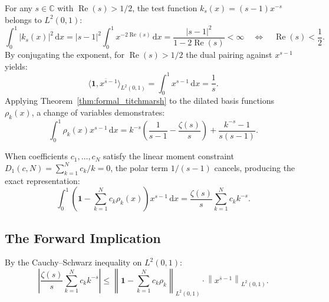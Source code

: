 \documentclass[11pt,a4paper]{article}
\theoremstyle{definition}
\newcommand{\dee}{\mathrm{d}}
\newcommand{\Cfield}{\mathbb{C}}
\begin{document}
For any $s \in \Cfield$ with $\operatorname{Re}(s) > 1/2$, the test function $k_s(x) = (s - 1) x^{-s}$ belongs to $L^2(0, 1)$:
\begin{equation}
\int_0^1 |k_s(x)|^2 \,\dee x = |s - 1|^2 \int_0^1 x^{-2\operatorname{Re}(s)}\,\dee x = \frac{|s - 1|^2}{1 - 2\operatorname{Re}(s)} < \infty \quad \Longleftrightarrow \quad \operatorname{Re}(s) < \frac{1}{2}.
\end{equation}
By conjugating the exponent, for $\operatorname{Re}(s) > 1/2$ the dual pairing against $x^{s-1}$ yields:
\begin{equation}
\langle \mathbf{1}, x^{\bar{s}-1} \rangle_{L^2(0, 1)} = \int_0^1 x^{s-1}\,\dee x = \frac{1}{s}.
\end{equation}
Applying Theorem~\ref{thm:formal_titchmarsh} to the dilated basis functions $\rho_k(x)$, a change of variables demonstrates:
\begin{equation}\label{eq:dilated_pairing}
\int_0^1 \rho_k(x) x^{s-1}\,\dee x = k^{-s} \left( \frac{1}{s - 1} - \frac{\zeta(s)}{s} \right) + \frac{k^{-s} - 1}{s(s - 1)}.
\end{equation}

When coefficients $c_1, \dots, c_N$ satisfy the linear moment constraint $D_1(c, N) = \sum_{k=1}^N c_k / k = 0$, the polar term $1/(s-1)$ cancels, producing the exact representation:
\begin{equation}\label{eq:residual_inner_product}
\int_0^1 \left( \mathbf{1} - \sum_{k=1}^N c_k \rho_k(x) \right) x^{s-1}\,\dee x = \frac{\zeta(s)}{s} \sum_{k=1}^N c_k k^{-s}.
\end{equation}

\subsection{The Forward Implication}

By the Cauchy--Schwarz inequality on $L^2(0, 1)$:
\begin{equation}\label{eq:cauchy_schwarz_zeta}
\left| \frac{\zeta(s)}{s} \sum_{k=1}^N c_k k^{-s} \right| \le \left\| \mathbf{1} - \sum_{k=1}^N c_k \rho_k \right\|_{L^2(0, 1)} \cdot \left\| x^{\bar{s}-1} \right\|_{L^2(0, 1)}.
\end{equation}
\end{document}
